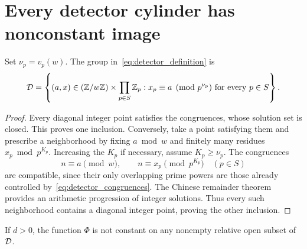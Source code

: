 \section{Every detector cylinder has nonconstant image}\label{sec:perfectness}

\begin{lemma}\label{lem:detector_group}
Set $\nu_p=v_p(w)$. The group in~\eqref{eq:detector_definition} is
\begin{equation}\label{eq:detector_congruences}
 \mathcal D=\left\{(a,x)\in(\mathbb Z/w\mathbb Z)\times\prod_{p\in S}\mathbb Z_p:
       x_p\equiv a\pmod{p^{\nu_p}}\text{ for every }p\in S\right\}.
\end{equation}
\end{lemma}

\begin{proof}
Every diagonal integer point satisfies the congruences, whose solution
set is closed. This proves one inclusion. Conversely, take a point
satisfying them and prescribe a neighborhood by fixing $a\bmod w$ and
finitely many residues $x_p\bmod p^{K_p}$. Increasing the $K_p$ if
necessary, assume $K_p\geq\nu_p$. The congruences
\[
 n\equiv a\pmod w,\qquad n\equiv x_p\pmod{p^{K_p}}\quad(p\in S)
\]
are compatible, since their only overlapping prime powers are those
already controlled by~\eqref{eq:detector_congruences}.
The Chinese remainder theorem provides an arithmetic progression of
integer solutions. Thus every such neighborhood contains a diagonal
integer point, proving the other inclusion.
\end{proof}

\begin{proposition}\label{prop:nowhere_constant}
If $d>0$, the function $\Phi$ is not constant on any nonempty relative
open subset of $\mathcal D$.
\end{proposition}

